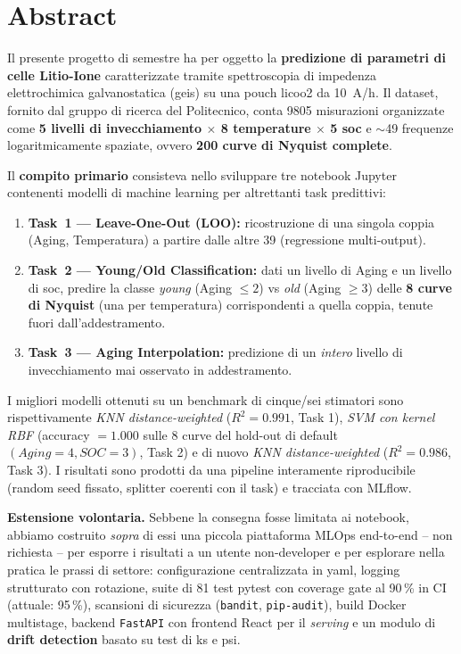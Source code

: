 \chapter*{Abstract}

\noindent
Il presente progetto di semestre ha per oggetto la \textbf{predizione di parametri
di celle Litio-Ione} caratterizzate tramite spettroscopia di impedenza
elettrochimica galvanostatica (\acrshort{geis}) su una pouch
\acrshort{licoo2} da \SI{10}{\ampere / \hour}. Il dataset, fornito dal
gruppo di ricerca del Politecnico, conta
\num{9805} misurazioni organizzate come \textbf{5 livelli di
invecchiamento $\times$ 8 temperature $\times$ 5 \acrshort{soc}} e
$\sim$49 frequenze logaritmicamente spaziate, ovvero \textbf{200 curve di
Nyquist complete}.

Il \textbf{compito primario} consisteva nello sviluppare tre notebook
Jupyter contenenti modelli di machine learning per altrettanti task
predittivi:
\begin{enumerate}[leftmargin=*]
  \item \textbf{Task~1 — Leave-One-Out (LOO):} ricostruzione di una
        singola coppia (Aging, Temperatura) a partire dalle altre 39
        (regressione multi-output).
  \item \textbf{Task~2 — Young/Old Classification:} dati un livello
        di Aging e un livello di \acrshort{soc}, predire la classe
        \emph{young} (Aging $\leq 2$) vs \emph{old} (Aging $\geq 3$)
        delle \textbf{8 curve di Nyquist} (una per temperatura)
        corrispondenti a quella coppia, tenute fuori dall'addestramento.
  \item \textbf{Task~3 — Aging Interpolation:} predizione di un
        \emph{intero} livello di invecchiamento mai osservato in
        addestramento.
\end{enumerate}

I migliori modelli ottenuti su un benchmark di cinque/sei stimatori
sono rispettivamente \emph{KNN distance-weighted} ($R^{2} = 0.991$,
Task 1), \emph{SVM con kernel RBF} (accuracy $= 1.000$ sulle 8 curve
del hold-out di default $(Aging = 4, SOC = 3)$, Task 2) e di nuovo
\emph{KNN distance-weighted} ($R^{2} = 0.986$, Task 3). I risultati
sono prodotti da una pipeline interamente riproducibile (random seed
fissato, splitter coerenti con il task) e tracciata con MLflow.

\medskip
\noindent
\textbf{Estensione volontaria.} Sebbene la consegna fosse limitata ai
notebook, abbiamo costruito \emph{sopra} di essi una piccola piattaforma
MLOps end-to-end -- non richiesta -- per esporre i risultati a un utente
non-developer e per esplorare nella pratica le prassi di settore:
configurazione centralizzata in \acrshort{yaml}, logging strutturato con
rotazione, suite di 81 test pytest con coverage gate al 90\,\% in CI
(attuale: 95\,\%),
scansioni di sicurezza (\texttt{bandit}, \texttt{pip-audit}), build
Docker multistage, backend \texttt{FastAPI} con frontend React per il
\emph{serving} e un modulo di \textbf{drift detection} basato su test di
\acrshort{ks} e \acrshort{psi}.

